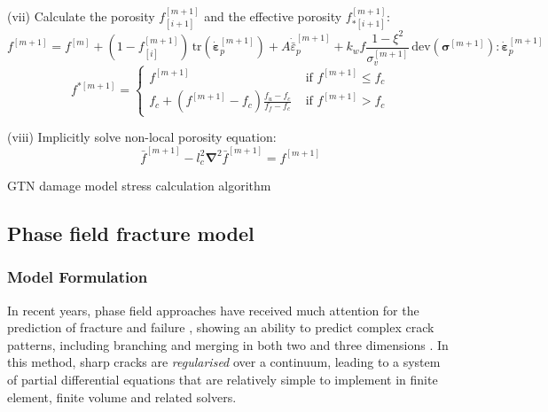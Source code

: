 \documentclass[sn-mathphys,Numbered,draft]{sn-jnl}%
\newcommand{\bb}{\boldsymbol}
\begin{document}
\begin{algorithm}[htbp]
(vii) Calculate the porosity $f_{[i+1]}^{[m+1]}$ and the effective porosity $f_{*[i+1]}^{[m+1]}$:
\begin{equation}
	f^{[m+1]} = f^{[m]} + \left(1 - f^{[m+1]}_{[i]}\right) \, \text{tr}\left(\dot{\boldsymbol{\varepsilon}}^{[m+1]}_p\right)
	+ A \dot{\bar{\varepsilon}}^{[m+1]}_p
	+ k_w f\frac{1 - \xi^2 }{\sigma_v^{[m+1]}} \,\text{dev}(\bb{\sigma}^{[m+1]}):{\dot{\boldsymbol{\varepsilon}}}_p^{[m+1]}
\end{equation}
\begin{equation}
	f^{*[m+1]} =
	\left\{
	\begin{array}{ll}
		f^{[m+1]}  & \text { if } f^{[m+1]}  \leq f_c \\
		f_c + \left(f^{[m+1]} - f_c\right) \frac{f_u - f_c}{f_f - f_c} & \text { if } f^{[m+1]}  > f_c
	\end{array}\right.
\end{equation}


(viii) Implicitly solve non-local porosity equation:
\begin{equation}
	\bar{f}^{[m+1]} -  l_c^2 \bb{\nabla}^2 \bar{f}^{[m+1]} = f^{[m+1]}
\end{equation}

\caption{GTN damage model stress calculation algorithm}
\end{algorithm}






\subsection{Phase field fracture model}

\subsubsection{Model Formulation}
In recent years, phase field approaches have received much attention for the prediction of fracture and failure \cite{borden_phase-field_2012, miehe_phase_2010, ambati_phase-field_2015, borden_phase-field_2016, miehe_phase_2016, dittmann_variational_2018, samaniego_phase-field_2021}, showing an ability to predict complex crack patterns, including branching and merging in both two and three dimensions \cite{borden_phase-field_2012, miehe_phase_2010}.
In this method, sharp cracks are \emph{regularised} over a continuum, leading to a system of partial differential equations that are relatively simple to implement in finite element, finite volume and related solvers.
\end{document}

